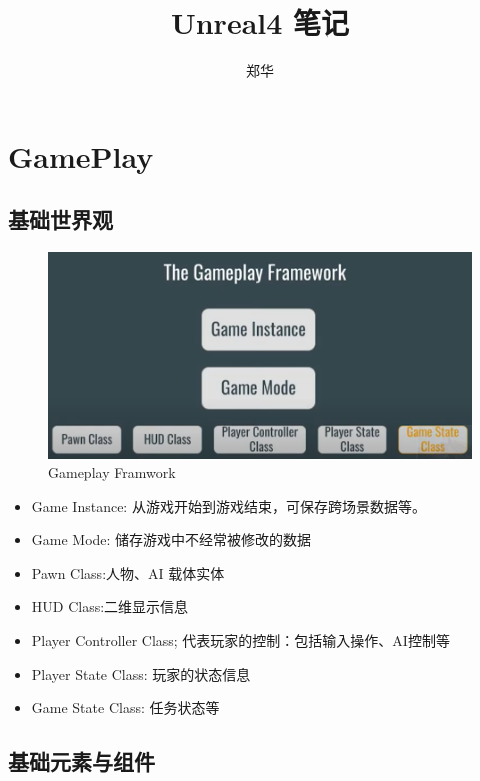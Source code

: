 \documentclass[UTF8,a4paper,12pt]{ctexbook}
\author{\kaishu 郑华}
\title{\heiti Unreal4 笔记}
\begin{document}
 	\maketitle
 	\tableofcontents


\chapter{GamePlay}
	\section{基础世界观}
		\begin{figure}[H]
			\centering
			\includegraphics[width=\linewidth]{Base}
			\caption{Gameplay Framwork}
		\end{figure}
		
		\begin{itemize}
			\item Game Instance: 从游戏开始到游戏结束，可保存跨场景数据等。
			\item Game Mode: 储存游戏中不经常被修改的数据
			\item Pawn Class:人物、AI 载体实体
			\item HUD Class:二维显示信息
			\item Player Controller Class; 代表玩家的控制：包括输入操作、AI控制等
			\item Player State Class: 玩家的状态信息
			\item Game State Class: 任务状态等
		\end{itemize}
		
	\section{基础元素与组件}
\end{document}
